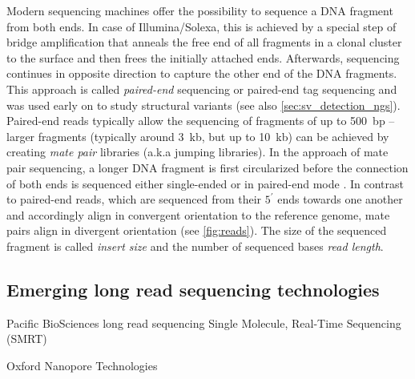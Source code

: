 Modern sequencing machines offer the possibility to sequence a DNA fragment
from both ends. In case of Illumina/Solexa, this is achieved by a special step
of bridge amplification that anneals the free end of all fragments in a clonal
cluster to the surface and then frees the initially attached ends. Afterwards,
sequencing continues in opposite direction to capture the other end of the
DNA fragments. This approach is called \emph{paired-end} sequencing or
paired-end tag sequencing and was used early on to study structural variants
\citep{Campbell2008} (see also \cref{sec:sv_detection_ngs}). Paired-end reads
typically allow the sequencing of fragments of up to 500~bp – larger fragments
(typically around 3~kb, but up to 10~kb) can be achieved by creating
\emph{mate pair} libraries (a.k.a jumping libraries). In the approach of mate
pair sequencing, a longer DNA fragment is first circularized before the
connection of both ends is sequenced either single-ended or in paired-end mode
\citep{Korbel2007}. In contrast to paired-end reads, which are sequenced from
their $5^\prime$ ends towards one another and accordingly align in convergent
orientation to the reference genome, mate pairs align in divergent orientation
(see \cref{fig:reads}). The size of the sequenced fragment is called
\emph{insert size} and the number of sequenced bases \emph{read length}.








\subsection{Emerging long read sequencing technologies}
\label{sec:long_read_seq}



Pacific BioSciences\texorpdfstring{\textsuperscript{\textregistered}}{(R)} long read sequencing
Single Molecule, Real-Time Sequencing (SMRT\textsuperscript{\textregistered})


Oxford Nanopore Technologies\texorpdfstring{\textsuperscript{\textregistered}}{{R}}

